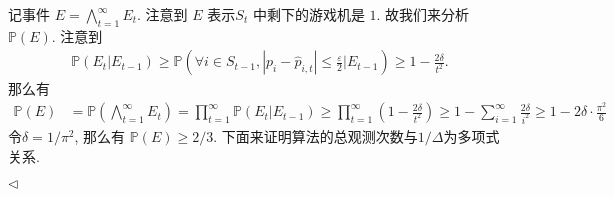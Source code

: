 \documentclass[11pt]{article}
\newenvironment{answer}[1][Solution]{\begin{trivlist}
    \item[\hskip \labelsep {\bfseries #1.}\hskip \labelsep]}{\hfill$\lhd$\end{trivlist}}
\newcommand\1{\mathds{1}}
\newcommand\PP{\mathbb{P}}
\begin{document}
\begin{answer}
\begin{enumerate}[label=(\arabic*)]
        记事件 $E = \bigwedge_{t=1}^{\infty} E_t$. 注意到 $E$ 表示$S_t$ 中剩下的游戏机是 $1$. 故我们来分析 $\PP(E)$. 注意到 %
        \begin{align}
            \label{eq:2}
            \PP(E_t|E_{t-1}) \ge \PP\left(\forall i\in S_{t-1}, |p_i - \hat{p}_{i,t}| \le \frac{\varepsilon}{2} \bigg| E_{t-1}\right) \ge 1 - \frac{2\delta}{t^2}.
        \end{align}
        那么有
        \begin{align*}
            \PP(E) &= \PP\left(\bigwedge_{t=1}^{\infty} E_t\right) = \prod_{t=1}^{\infty} \PP(E_t|E_{t-1}) \ge \prod_{t=1}^{\infty} \left(1 - \frac{2\delta}{t^2}\right) \ge 1 - \sum_{i=1}^{\infty} \frac{2\delta}{i^2} \ge 1 - 2\delta\cdot \frac{\pi^2}{6} 
        \end{align*}
        令$\delta = 1/\pi^2$, 那么有 $\PP(E) \ge 2/3$. 下面来证明算法的总观测次数与$1/\Delta$为多项式关系. 
        

\end{enumerate}
\end{answer}
\end{document}
